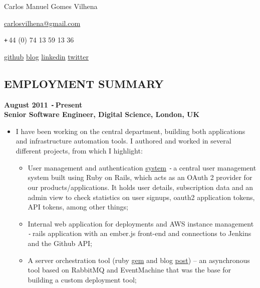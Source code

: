 \documentclass{res}
\def\Plus{\texttt{+}\,}
\def\Minus{\texttt{-}\,}
\begin{document}
\thispagestyle{empty}
\centerline{Carlos Manuel Gomes Vilhena}
\vspace{0.1in}
\centerline{\href{mailto:carlosvilhena@gmail.com}{carlosvilhena@gmail.com}}
\centerline{\Plus 44 (0) 74 13 59 13 36}
\centerline{\href{http://github.com/carvil}{github} \hspace{0.5 cm}
\href{http://carvil.github.com/}{blog}  \hspace{0.5 cm}
\href{http://www.linkedin.com/in/carlosvilhena}{linkedin}  \hspace{0.5 cm}
\href{http://www.twitter.com/carvil_}{twitter}
}


\begin{resume}
\vspace{0.1in}


\section{EMPLOYMENT SUMMARY}
\vspace{0.1in}
  {\bf August 2011 \Minus Present}\\
  {\bf Senior Software Engineer, Digital Science, London, UK}
    \begin{itemize} %
      \item[] I have been working on the central department, building both
      applications and infrastructure automation tools. I authored and worked
      in several different projects, from which I highlight:
        \begin{itemize}
        \item User management and authentication \href{https://auth.digital-science.com/}{system} \Minus a central user management
        system built using Ruby on Rails, which acts as an OAuth 2 provider for
        our products/applications. It holds user details, subscription data and
        an admin view to check statistics on user signups, oauth2 application
        tokens, API tokens, among other things;
        \item Internal web application for deployments and AWS instance management \Minus rails application with an ember.js front-end and connections to Jenkins and the Github API;
        \item A server orchestration tool (ruby \href{https://rubygems.org/gems/baton}{gem} and blog \href{http://www.digital-science.com/blog/posts/presenting-baton}{post}) – an asynchronous tool based on RabbitMQ and EventMachine that was the base for building a custom deployment tool;

\end{itemize}
\end{itemize}
\end{resume}
\end{document}
